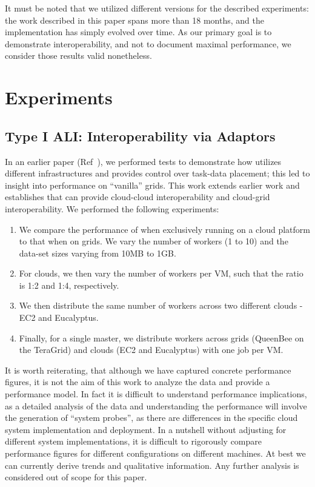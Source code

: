 \documentclass[3p,twocolumn]{elsarticle}
\begin{document}
It must be noted that we utilized different \smr versions for the
described experiments: the work described in this paper spans more
than 18 months, and the \smr implementation has simply evolved over
time.  As our primary goal is to demonstrate interoperability, and not
to document maximal performance, we consider those results valid
nonetheless.


\section{Experiments} 
\label{sec:exp}

\subsection{Type I ALI: Interoperability via Adaptors}

In an earlier paper (Ref~\cite{saga_ccgrid09}), we performed tests to
demonstrate how \sagamapreduce utilizes different infrastructures and
provides control over task-data placement; this led to insight into
performance on ``vanilla'' grids.  This work extends earlier work and
establishes that \sagamapreduce can provide cloud-cloud
interoperability and cloud-grid interoperability.  We performed the
following experiments:

\begin{enumerate}

 \item We compare the performance of \sagamapreduce when exclusively
 running on a cloud platform to that when on grids. We vary the number
 of workers (1 to 10) and the data-set sizes varying from 10MB to 1GB.

 \item For clouds, we then vary the number of workers per VM, such
 that the ratio is 1:2 and 1:4, respectively.

 \item We then distribute the same number of workers across two
 different clouds - EC2 and Eucalyptus.

 \item Finally, for a single master, we distribute workers across
 grids (QueenBee on the TeraGrid) and clouds (EC2 and Eucalyptus) with
 one job per VM.

\end{enumerate}

It is worth reiterating, that although we have captured concrete
performance figures, it is not the aim of this work to analyze the
data and provide a performance model. In fact it is difficult to
understand performance implications, as a detailed analysis of the
data and understanding the performance will involve the generation of
``system probes'', as there are differences in the specific cloud
system implementation and deployment.  In a nutshell without adjusting
for different system implementations, it is difficult to rigorously
compare performance figures for different configurations on different
machines. At best we can currently derive trends and qualitative
information.  Any further analysis is considered out of scope for this
paper.
\end{document}
